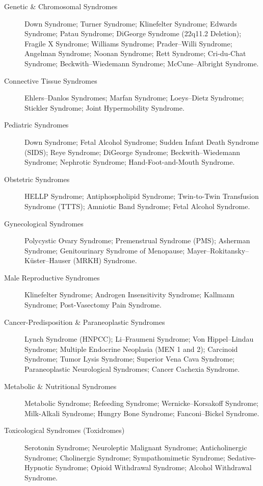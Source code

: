 \begin{description}
\item[Genetic \& Chromosomal Syndromes] Down Syndrome; Turner Syndrome; Klinefelter Syndrome; Edwards Syndrome; Patau Syndrome; DiGeorge Syndrome (22q11.2 Deletion); Fragile X Syndrome; Williams Syndrome; Prader–Willi Syndrome; Angelman Syndrome; Noonan Syndrome; Rett Syndrome; Cri-du-Chat Syndrome; Beckwith–Wiedemann Syndrome; McCune–Albright Syndrome.

\item[Connective Tissue Syndromes] Ehlers–Danlos Syndromes; Marfan Syndrome; Loeys–Dietz Syndrome; Stickler Syndrome; Joint Hypermobility Syndrome.

\item[Pediatric Syndromes] Down Syndrome; Fetal Alcohol Syndrome; Sudden Infant Death Syndrome (SIDS); Reye Syndrome; DiGeorge Syndrome; Beckwith–Wiedemann Syndrome; Nephrotic Syndrome; Hand-Foot-and-Mouth Syndrome.

\item[Obstetric Syndromes] HELLP Syndrome; Antiphospholipid Syndrome; Twin-to-Twin Transfusion Syndrome (TTTS); Amniotic Band Syndrome; Fetal Alcohol Syndrome.

\item[Gynecological Syndromes] Polycystic Ovary Syndrome; Premenstrual Syndrome (PMS); Asherman Syndrome; Genitourinary Syndrome of Menopause; Mayer–Rokitansky–Küster–Hauser (MRKH) Syndrome.

\item[Male Reproductive Syndromes] Klinefelter Syndrome; Androgen Insensitivity Syndrome; Kallmann Syndrome; Post-Vasectomy Pain Syndrome.

\item[Cancer-Predisposition \& Paraneoplastic Syndromes] Lynch Syndrome (HNPCC); Li–Fraumeni Syndrome; Von Hippel–Lindau Syndrome; Multiple Endocrine Neoplasia (MEN 1 and 2); Carcinoid Syndrome; Tumor Lysis Syndrome; Superior Vena Cava Syndrome; Paraneoplastic Neurological Syndromes; Cancer Cachexia Syndrome.

\item[Metabolic \& Nutritional Syndromes] Metabolic Syndrome; Refeeding Syndrome; Wernicke–Korsakoff Syndrome; Milk-Alkali Syndrome; Hungry Bone Syndrome; Fanconi–Bickel Syndrome.

\item[Toxicological Syndromes (Toxidromes)] Serotonin Syndrome; Neuroleptic Malignant Syndrome; Anticholinergic Syndrome; Cholinergic Syndrome; Sympathomimetic Syndrome; Sedative-Hypnotic Syndrome; Opioid Withdrawal Syndrome; Alcohol Withdrawal Syndrome.


\end{description}
